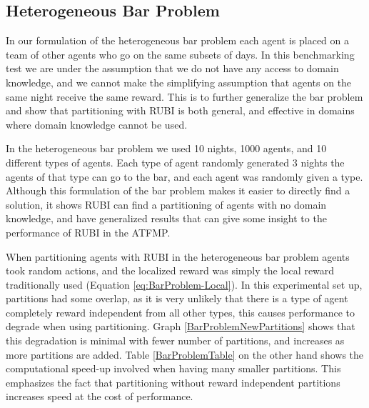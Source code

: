 \documentclass[onehalf,11pt]{beavtex}
\begin{document}
\subsection{Heterogeneous Bar Problem}
In our formulation of the heterogeneous bar problem each agent is placed on a team of other agents who go on the same subsets of days. In this benchmarking test we are under the assumption that we do not have any access to domain knowledge, and we cannot make the simplifying assumption that agents on the same night receive the same reward. This is to further generalize the bar problem and show that partitioning with RUBI is both general, and effective in domains where domain knowledge cannot be used. 

In the heterogeneous bar problem we used 10 nights, 1000 agents, and 10 different types of agents. Each type of agent randomly generated 3 nights the agents of that type can go to the bar, and each agent was randomly given a type. Although this formulation of the bar problem makes it easier to directly find a solution, it shows RUBI can find a partitioning of agents with no domain knowledge, and have generalized results that can give some insight to the performance of RUBI in the ATFMP. 

When partitioning agents with RUBI in the heterogeneous bar problem agents took random actions, and the localized reward was simply the local reward traditionally used (Equation \ref{eq:BarProblem-Local}). In this experimental set up, partitions had some overlap, as it is very unlikely that there is a type of agent completely reward independent from all other types, this causes performance to degrade when using partitioning. Graph \ref{BarProblemNewPartitions} shows that this degradation is minimal with fewer number of partitions, and increases as more partitions are added. Table \ref{BarProblemTable} on the other hand shows the computational speed-up involved when having many smaller partitions. This emphasizes the fact that partitioning without reward independent partitions increases speed at the cost of performance.
\end{document}
